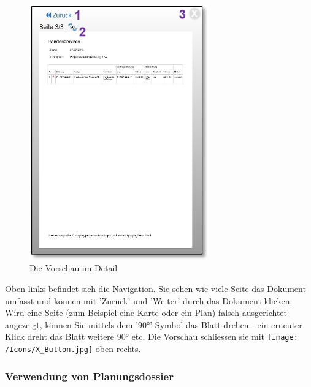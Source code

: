 \begin{figure}   %
  \vspace{-30pt}      %
  \begin{center}
    \includegraphics[height=110mm]{../chapters/11_Dokumentenablage/pictures/11-1-2_VorschauDetails.jpg}
  \end{center}
  \vspace{-20pt}
  \caption{Die Vorschau im Detail}
  \vspace{-10pt}
\end{figure}
Oben links befindet sich die Navigation. Sie sehen wie viele Seite das Dokument umfasst und können mit 'Zurück' und 'Weiter'  durch das Dokument klicken. Wird eine Seite (zum Beispiel eine Karte oder ein Plan) falsch ausgerichtet angezeigt, können Sie mittels dem '90°'-Symbol das Blatt drehen - ein erneuter Klick dreht das Blatt weitere 90° etc. Die Vorschau schliessen sie mit \texttt{[image: /Icons/X\_Button.jpg]}  oben rechts.

\vspace{5cm}

\subsubsection{Verwendung von Planungsdossier}

